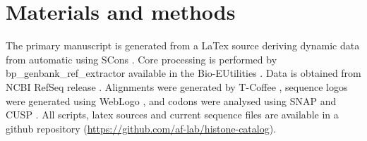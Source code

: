 \section{Materials and methods}
\label{sec:matmethods}

	The primary manuscript is generated from a LaTex source 
	deriving dynamic data from automatic using SCons  \citep{SCons2005}.
	Core processing is performed by bp\_genbank\_ref\_extractor
	available in the Bio-EUtilities  \citep{BioPerl2002}.
	Data is obtained from NCBI RefSeq release .
	Alignments were generated by T-Coffee   \citep{tcoffee2000}, 
	sequence logos were generated using WebLogo   \citep{weblogo}, 
	and codons were analysed using SNAP  \citep{KorberSNAP2000} and CUSP  \citep{Emboss2000}.
	All scripts, latex sources and current sequence files are available in a github repository (\url{https://github.com/af-lab/histone-catalog}).
